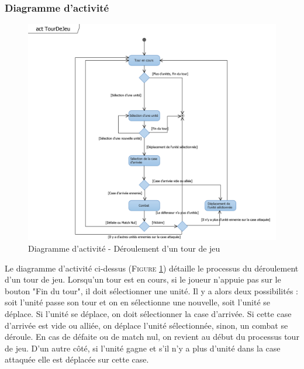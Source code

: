 \documentclass[a4paper,11pt]{article}
\begin{document}
		\subsubsection{Diagramme d'activité}
			\begin{figure}[ht!]
				\includegraphics{Diagrammes/Tour/actTourDeJeu.png}
				\caption{Diagramme d'activité - Déroulement d'un tour de jeu}
				\label{fig:acttour}
				\end{figure}
			\vspace*{1cm}
			Le diagramme d'activité ci-dessus (\textsc{Figure \ref{fig:acttour}}) détaille le processus du déroulement d'un tour de jeu. Lorsqu'un tour est en cours, si le joueur n'appuie pas sur le bouton "Fin du tour", il doit sélectionner une unité. Il y a alors deux possibilités : soit l'unité passe son tour et on en sélectionne une nouvelle, soit l'unité se déplace. Si l'unité se déplace, on doit sélectionner la case d'arrivée. Si cette case d'arrivée est vide ou alliée, on déplace l'unité sélectionnée, sinon, un combat se déroule. En cas de défaite ou de match nul, on revient au début du processus tour de jeu. D'un autre côté, si l'unité gagne et s'il n'y a plus d'unité dans la case attaquée elle est déplacée sur cette case.
			\newpage
\end{document}
